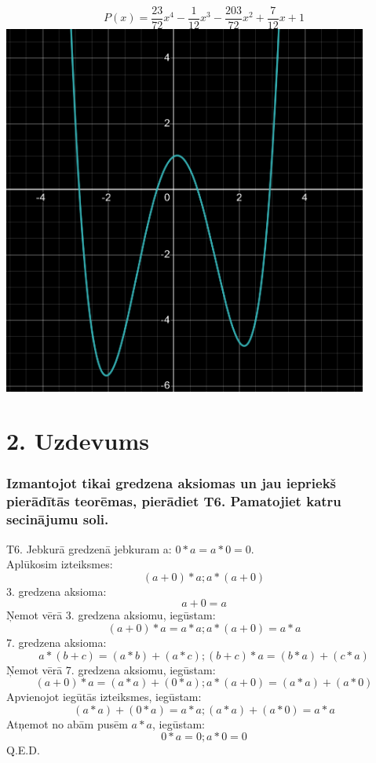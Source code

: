 \documentclass{article}
\begin{document}
\begin{equation*}
    P(x) = \frac{23}{72} x^4 - \frac{1}{12} x^3 - \frac{203}{72} x^2 + \frac{7}{12} x + 1
\end{equation*}
\includegraphics[width=0.9\textwidth, center]{1}

\section*{2. Uzdevums}
\subsubsection*{Izmantojot tikai gredzena aksiomas un jau iepriekš pierādītās teorēmas, pierādiet T6. Pamatojiet katru secinājumu soli.}

T6. Jebkurā gredzenā jebkuram a: $0*a=a*0=0$.
\\
Aplūkosim izteiksmes:
\begin{equation*}
    (a+0)*a ; a*(a+0)
\end{equation*}
3. gredzena aksioma:
\begin{equation*}
    a+0=a
\end{equation*}
Ņemot vērā 3. gredzena aksiomu, iegūstam:
\begin{equation*}
    (a+0)*a = a*a; a*(a+0) = a*a
\end{equation*}
7. gredzena aksioma:
\begin{equation*}
    a*(b+c)=(a*b)+(a*c);(b+c)*a=(b*a)+(c*a)
\end{equation*}
Ņemot vērā 7. gredzena aksiomu, iegūstam:
\begin{equation*}
    (a+0)*a = (a*a)+(0*a); a*(a+0) = (a*a)+(a*0)
\end{equation*}
Apvienojot iegūtās izteiksmes, iegūstam:
\begin{equation*}
    (a*a)+(0*a) = a*a; (a*a)+(a*0) = a*a
\end{equation*}
Atņemot no abām pusēm $a*a$, iegūstam:
\begin{equation*}
    0*a = 0; a*0 = 0
\end{equation*}
Q.E.D.
\end{document}

